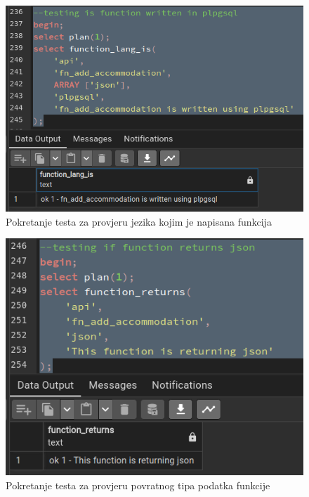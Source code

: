 				\begin{figure}[H]
					\centering
					\includegraphics[width=\textwidth]{slike/unit_tests/ut_4/func_lang.png}
					\caption{Pokretanje testa za provjeru jezika kojim je napisana funkcija}
					\label{fig: IS4-function_lang}
				\end{figure}
				\begin{figure}[H]
					\centering
					\includegraphics[width=\textwidth]{slike/unit_tests/ut_4/func_return.png}
					\caption{Pokretanje testa za provjeru povratnog tipa podatka funkcije}
					\label{fig: IS4-function_return}
				\end{figure}
